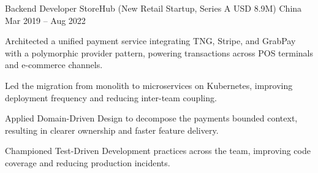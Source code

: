 \begin{cventries}
  \cventry
    {Backend Developer}
    {StoreHub (New Retail Startup, Series A USD 8.9M)}
    {China}
    {Mar 2019 -- Aug 2022}
    {
      \begin{cvitems}
        \item {Architected a unified payment service integrating TNG, Stripe, and GrabPay with a polymorphic provider pattern, powering transactions across POS terminals and e-commerce channels.}
        \item {Led the migration from monolith to microservices on Kubernetes, improving deployment frequency and reducing inter-team coupling.}
        \item {Applied Domain-Driven Design to decompose the payments bounded context, resulting in clearer ownership and faster feature delivery.}
        \item {Championed Test-Driven Development practices across the team, improving code coverage and reducing production incidents.}
      \end{cvitems}
    }
\end{cventries}
